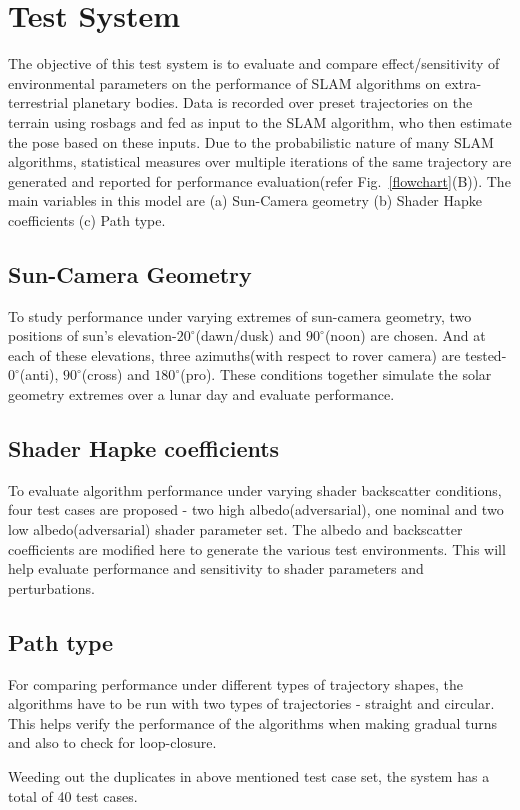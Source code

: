 \documentclass[a4paper, 10pt, conference]{ieeeconf}      %
\begin{document}
\section{Test System}
The objective of this test system is to evaluate and compare effect/sensitivity of environmental parameters on the performance of SLAM algorithms on extra-terrestrial planetary bodies. Data is recorded over preset trajectories on the terrain using rosbags and fed as input to the SLAM algorithm, who then estimate the pose based on these inputs. Due to the probabilistic nature of many SLAM algorithms, statistical measures over multiple iterations of the same trajectory are generated and reported for performance evaluation(refer Fig.~\ref{flowchart}(B)).
The main variables in this model are (a) Sun-Camera geometry (b) Shader Hapke coefficients (c) Path type.
\subsection{Sun-Camera Geometry}
To study performance under varying extremes of sun-camera geometry, two positions of sun's elevation-$20^\circ$(dawn/dusk) and $90^\circ$(noon) are chosen. And at each of these elevations,  three azimuths(with respect to rover camera) are tested-$0^\circ$(anti), $90^\circ$(cross) and $180^\circ$(pro). These conditions together simulate the solar geometry extremes over a lunar day and evaluate performance.
\subsection{Shader Hapke coefficients}
To evaluate algorithm performance under varying shader backscatter conditions, four test cases are proposed - two high albedo(adversarial), one nominal and two low albedo(adversarial) shader parameter set. The albedo and backscatter coefficients are modified here to generate the various test environments. This will help evaluate performance and sensitivity to shader parameters and perturbations.
\subsection{Path type}
For comparing performance under different types of trajectory shapes, the algorithms have to be run with two types of trajectories - straight and circular. This helps verify the performance of the algorithms when making gradual turns and also to check for loop-closure.

Weeding out the duplicates in above mentioned test case set, the system has a total of 40 test cases.
\end{document}
